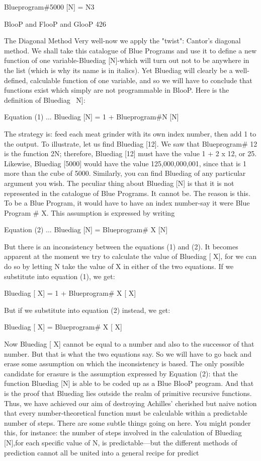                              Blueprogram{\#5000} [N] = N3




BlooP and FlooP and GlooP                                                                 426

                                The Diagonal Method
Very well-now we apply the "twist": Cantor's diagonal method. We shall take this
catalogue of Blue Programs and use it to define a new function of one variable-Bluediag
[N]-which will turn out not to be anywhere in the list (which is why its name is in italics).
Yet Bluediag will clearly be a well-defined, calculable function of one variable, and so
we will have to conclude that functions exist which simply are not programmable in
BlooP.
      Here is the definition of Bluediag ~N]:

      Equation (1) ... Bluediag [N] = 1 + Blueprogram{\#N} [N]

The strategy is: feed each meat grinder with its own index number, then add 1 to the
output. To illustrate, let us find Bluediag [12]. We saw that Blueprogram{\# 12} is the
function 2N; therefore, Bluediag [12] must have the value 1 + 2 x 12, or 25. Likewise,
Bluediag [5000] would have the value 125,000,000,001, since that is 1 more than the
cube of 5000. Similarly, you can find Bluediag of any particular argument you wish.
        The peculiar thing about Bluediag [N] is that it is not represented in the catalogue
of Blue Programs. It cannot be. The reason is this. To be a Blue Program, it would have
to have an index number-say it were Blue Program \# X. This assumption is expressed by
writing

       Equation (2) ...        Bluediag [N] = Blueprogram{\# X} [N]

But there is an inconsistency between the equations (1) and (2). It becomes apparent at
the moment we try to calculate the value of Bluediag [ X], for we can do so by letting N
take the value of X in either of the two equations. If we substitute into equation (1), we
get:

       Bluediag [ X] = 1 + Blueprogram{\# X} [ X]

But if we substitute into equation (2) instead, we get:

       Bluediag [ X] = Blueprogram{\# X} [ X]

Now Bluediag [ X] cannot be equal to a number and also to the successor of that number.
But that is what the two equations say. So we will have to go back and erase some
assumption on which the inconsistency is based. The only possible candidate for erasure
is the assumption expressed by Equation (2): that the function Bluediag [N] is able to be
coded up as a Blue BlooP program. And that is the proof that Bluediag lies outside the
realm of primitive recursive functions. Thus, we have achieved our aim of destroying
Achilles' cherished but naive notion that every number-theoretical function must be
calculable within a predictable number of steps.
        There are some subtle things going on here. You might ponder this, for instance:
the number of steps involved in the calculation of Bluediag [N],for each specific value of
N, is predictable—but the different methods of prediction cannot all be united into a
general recipe for predict


